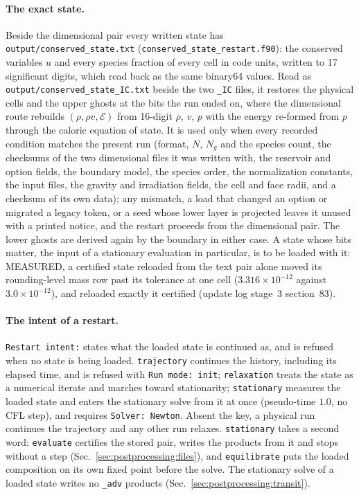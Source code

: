\paragraph{The exact state.} Beside the dimensional pair every written state
has \texttt{output/conserved\_state.txt}
(\texttt{conserved\_state\_restart.f90}): the conserved variables $u$ and
every species fraction of every cell in code units, written to 17
significant digits, which read back as the same binary64 values.  Read as
\texttt{output/conserved\_state\_IC.txt} beside the two \texttt{\_IC} files,
it restores the physical cells and the upper ghosts at the bits the run ended
on, where the dimensional route rebuilds $(\rho,\rho v,\mathcal{E})$ from
16-digit $\rho$, $v$, $p$ with the energy re-formed from $p$ through the
caloric equation of state.  It is used only when every recorded condition
matches the present run (format, $N$, $N_g$ and the species count, the
checksums of the two dimensional files it was written with, the reservoir
and option fields, the boundary model, the species order, the normalization
constants, the input files, the gravity and irradiation fields, the cell and
face radii, and a checksum of its own data); any mismatch, a load that
changed an option or migrated a legacy token, or a seed whose lower layer is
projected leaves it unused with a printed notice, and the restart proceeds
from the dimensional pair.  The lower ghosts are derived again by the
boundary in either case.  A state whose bits matter, the input of a
stationary evaluation in particular, is to be loaded with it: MEASURED, a
certified state reloaded from the text pair alone moved its rounding-level
mass row past its tolerance at one cell ($3.316\times10^{-12}$ against $3.0\times10^{-12}$),
and reloaded exactly it certified (update log stage~3 section~83).

\paragraph{The intent of a restart.}
\texttt{Restart intent:} states what the loaded state is continued as, and is
refused when no state is being loaded.  \texttt{trajectory} continues the
history, including its elapsed time, and is refused with \texttt{Run mode:
init}; \texttt{relaxation} treats the state as a numerical iterate and
marches toward stationarity; \texttt{stationary} measures the loaded state
and enters the stationary solve from it at once (pseudo-time $1.0$, no CFL
step), and requires \texttt{Solver: Newton}.  Absent the key, a physical run
continues the trajectory and any other run relaxes.  \texttt{stationary}
takes a second word: \texttt{evaluate} certifies the stored pair, writes the
products from it and stops without a step
(Sec.~\ref{sec:postprocessing:files}), and \texttt{equilibrate} puts the
loaded composition on its own fixed point before the solve.  The
stationary solve of a loaded state writes no \texttt{\_adv} products
(Sec.~\ref{sec:postprocessing:transit}).

